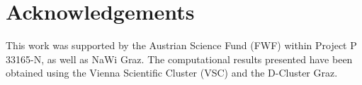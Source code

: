 \documentclass[aps,prb,groupedaddress,showpacs,twocolumn,superscriptaddress,10pt]{revtex4-2}
\begin{document}
 


 
\section*{Acknowledgements}
This work was supported by the Austrian Science Fund (FWF) within Project P 33165-N, as well as NaWi Graz. The computational results presented have been obtained using the Vienna Scientific Cluster (VSC) and the D-Cluster Graz.
 
     
      
   
   

 
%  
%
% 
%
\end{document}
